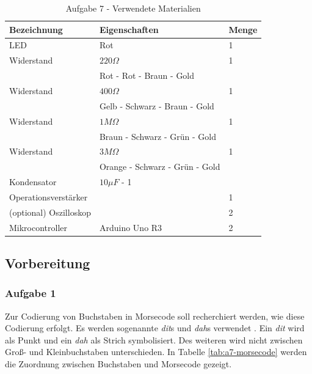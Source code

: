 \begin{table}[ht]
    \centering
    \caption{Aufgabe 7 - Verwendete Materialien}
    \label{tab:a7-materialien}
    \begin{tabular}{| l | l | l |}
        \hline
        Bezeichnung & Eigenschaften & Menge \\
        \hline
        LED & Rot & 1 \\
        Widerstand & $220\Omega$ & 1 \\
        & Rot - Rot - Braun - Gold & \\
        Widerstand & $400\Omega$ & 1 \\
        & Gelb - Schwarz - Braun - Gold & \\
        Widerstand & $1M\Omega$ & 1 \\
        & Braun - Schwarz - Grün - Gold & \\
        Widerstand & $3M\Omega$ & 1 \\
        & Orange - Schwarz - Grün - Gold & \\
        Kondensator & $10 \mu F$ - 1 \\
        Operationsverstärker & & 1 \\
        (optional) Oszilloskop & & 2\\
        Mikrocontroller & Arduino Uno R3 & 2 \\
        \hline
    \end{tabular}
\end{table}

\subsection{Vorbereitung}
\label{subsec:a7-vorbereitung}

\subsubsection{Aufgabe 1}

Zur Codierung von Buchstaben in Morsecode soll recherchiert werden, wie diese Codierung erfolgt.
Es werden sogenannte \textit{dit}s und \textit{dah}s verwendet \cite{morsecode}.
Ein \textit{dit} wird als Punkt und ein \textit{dah} als Strich symbolisiert.
Des weiteren wird nicht zwischen Groß- und Kleinbuchstaben unterschieden.
In Tabelle \ref{tab:a7-morsecode} werden die Zuordnung zwischen Buchstaben und Morsecode gezeigt.

